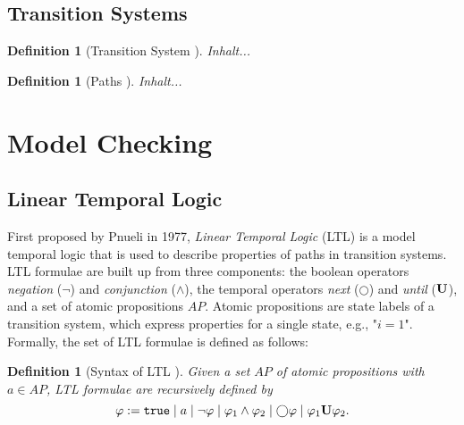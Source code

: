 \documentclass[a4paper, 12pt, twoside]{report}
\theoremstyle{plain}
\newtheorem{definition}[theorem]{Definition}
\begin{document}
	\subsection{Transition Systems}
	
	\begin{definition}[Transition System \cite{baier2008principles}]\label{def:transition system}
		Inhalt...
	\end{definition}

	\begin{definition}[Paths \cite{baier2008principles}]\label{def:paths}
		Inhalt...
	\end{definition}
	
	
	\section{Model Checking}
	
	\subsection{Linear Temporal Logic}
	
	 
	First proposed by Pnueli in 1977, \textit{Linear Temporal Logic} (LTL) is a model temporal logic that is used to describe properties of paths in transition systems. LTL formulae are built up from three components: the boolean operators \textit{negation} ($\neg$) and \textit{conjunction} ($\wedge$), the temporal operators \textit{next} ($\bigcirc$) and \textit{until} ($\textbf{\textup{U}}$), and a set of atomic propositions $AP$. Atomic propositions are state labels of a transition system, which express properties for a single state, e.g., "$i=1$". Formally, the set of LTL formulae is defined as follows:
	
	\begin{definition}[Syntax of LTL \cite{baier2008principles}]\label{def:ltl_syntax}
		Given a set $AP$ of atomic propositions with $a \in AP$, \textup{LTL formulae} are recursively defined by
		\begin{equation*}		
			\varphi := \texttt{\textup{true}} \mid a \mid \neg \varphi \mid \varphi_1 \wedge \varphi_2 \mid \bigcirc \varphi \mid \varphi_1 \textbf{\textup{U}} \varphi_2.
		\end{equation*}
	\end{definition}
\end{document}
